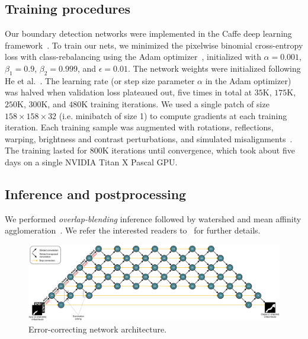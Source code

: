 \documentclass{article}
\begin{document}
\subsection{Training procedures} Our boundary detection networks were
implemented in the Caffe deep learning framework~\cite{jia2014caffe}. To train
our nets, we minimized the pixelwise binomial cross-entropy loss with
class-rebalancing using the Adam optimizer~\cite{adam}, initialized with
$\alpha=0.001$, $\beta_1=0.9$, $\beta_2=0.999$, and $\epsilon=0.01$. The network
weights were initialized following He et al.~\cite{he2015delving}. The learning
rate (or step size parameter $\alpha$ in the Adam optimizer) was halved when
validation loss plateaued out, five times in total at $35$K, $175$K, $250$K,
$300$K, and $480$K training iterations. We used a single patch of size
$158\times158\times32$ (i.e. minibatch of size 1) to compute gradients at each
training iteration. Each training sample was augmented with rotations,
reflections, warping, brightness and contrast perturbations, and simulated
misalignments~\cite{kisuk}. The training lasted for $800$K iterations until
convergence, which took about five days on a single NVIDIA Titan X Pascal GPU.

\subsection{Inference and postprocessing} We performed \emph{overlap-blending}
inference followed by watershed and mean affinity agglomeration~\cite{kisuk}. We
refer the interested readers to~\cite{kisuk} for further details.

\label{appendix:architecture}

\begin{figure}
\centering
\includegraphics[width=1.0\linewidth]{corrector.pdf}
\caption{Error-correcting network architecture.}
\label{fig:corrector}
\end{figure}
\end{document}

